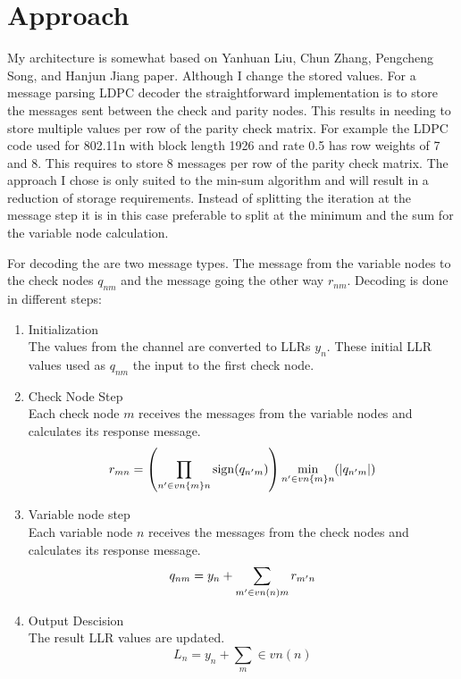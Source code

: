 
\chapter{Approach}
My architecture is somewhat based on  Yanhuan Liu, Chun Zhang, Pengcheng Song, and Hanjun Jiang\cite{LiZh17} paper. Although I change the stored values. For a message parsing LDPC decoder the straightforward implementation is to store the messages sent between the check and parity nodes. This results in needing to store multiple values per row of the parity check matrix. For example the LDPC code used for 802.11n with block length 1926 and rate 0.5 has row weights of 7 and 8. This requires to store 8 messages per row of the parity check matrix. The approach I chose is only suited to the min-sum algorithm and will result in a reduction of storage requirements. Instead of splitting the iteration at the message step it is in this case preferable to split at the minimum and the sum for the variable node calculation.

For decoding the are two message types. The message from the variable nodes to the check nodes $q_{nm}$ and the message going the other way $r_{nm}$. Decoding is done in different steps\cite{EmEl14}:

\begin{enumerate}
\item{Initialization}\\
The values from the channel are converted to LLRs $y_n$. These initial LLR values used as $q_{nm}$ the input to the first check node.

\item{Check Node Step}\\
Each check node $m$ receives the messages from the variable nodes and calculates its response message.
\begin{equation}
    r_{mn} = \left( \prod_{n' \in vn\{m\}\\n}\operatorname{sign}(q_{n'm}) \right) \min_{n' \in vn\{m\}\\n}(\left|q_{n'm}\right|)
\end{equation}

\item{Variable node step}\\
Each variable node $n$ receives the messages from the check nodes and calculates its response message.
\begin{equation}
    q_{nm} = y_n + \sum_{m' \in vn(n) \\m}r_{m'n}
\end{equation}

\item{Output Descision}\\
The result LLR values are updated.
\begin{equation}
    L_n = y_n + \sum_m \in vn(n)
\end{equation}

\end{enumerate}

